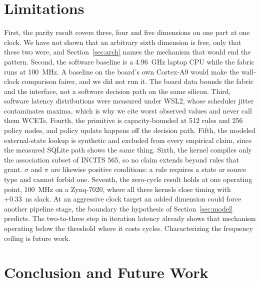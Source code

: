 \documentclass[conference]{IEEEtran}
\newcommand{\new}[1]{#1}
\begin{document}
\section{Limitations}
\label{sec:limitations}

\new{First, the parity result covers three, four and five dimensions on one part at one clock. We have not shown that an arbitrary sixth dimension is free, only that these two were, and Section~\ref{sec:arch} names the mechanism that would end the pattern.} \new{Second,} the software baseline is a 4.96~GHz laptop CPU while the fabric runs at 100~MHz. A baseline on the board's own Cortex-A9 would make the wall-clock comparison fairer, and we did not run it. \new{The board data bounds the fabric and the interface, not a software decision path on the same silicon.} \new{Third,} software latency distributions were measured under WSL2, whose scheduler jitter contaminates maxima, which is why we cite worst observed values and never call them WCETs. \new{Fourth,} the primitive is capacity-bounded at 512 rules and 256 policy nodes, and policy update happens off the decision path. \new{Fifth,} the modeled external-state lookup is synthetic and excluded from every empirical claim, since the measured SQLite path shows the same thing. \new{Sixth,} the kernel compiles only the association subset of INCITS 565, so no claim extends beyond rules that grant. \new{$\sigma$ and $\pi$ are likewise positive conditions: a rule requires a state or source type and cannot forbid one.} \new{Seventh,} the zero-cycle result holds at one operating point, 100~MHz on a Zynq-7020, where \new{all three} kernels close timing with +0.33~ns slack. At an aggressive clock target \new{an} added dimension could force another pipeline stage, the boundary the hypothesis of Section~\ref{sec:model} predicts\new{. The two-to-three step in iteration latency already shows that mechanism operating below the threshold where it costs cycles}. Characterizing the frequency ceiling is future work.

\section{Conclusion and Future Work}
\label{sec:conclusion}
\end{document}
